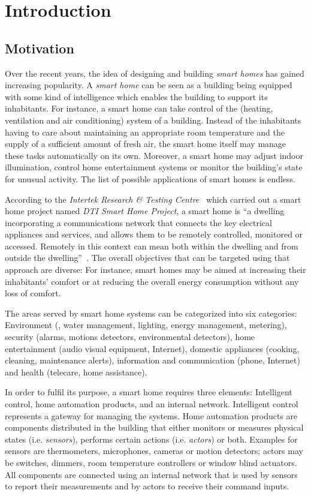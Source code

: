\chapter{Introduction}
\label{ch:intro}

\section{Motivation}
\label{sec:motivation}

Over the recent years, the idea of designing and building \emph{smart homes} has gained increasing popularity. A \emph{smart home} can be seen as a building being equipped with some kind of intelligence which enables the building to support its inhabitants. For instance, a smart home can take control of the  (heating, ventilation and air conditioning) system of a building. Instead of the inhabitants having to care about maintaining an appropriate room temperature and the supply of a sufficient amount of fresh air, the smart home itself may manage these tasks automatically on its own. Moreover, a smart home may adjust indoor illumination, control home entertainment systems or monitor the building's state for unusual activity. The list of possible applications of smart homes is endless.

According to the \emph{Intertek Research \& Testing Centre}~\cite{intertek} which carried out a smart home project named \emph{DTI Smart Home Project}, a smart home is ``a dwelling incorporating a communications network that connects the key electrical appliances and services, and allows them to be remotely controlled, monitored or accessed. Remotely in this context can mean both within the dwelling and from outside the dwelling''~\cite{SmartHomeDefinition,SmartHomeResearch}. The overall objectives that can be targeted using that approach are diverse: For instance, smart homes may be aimed at increasing their inhabitants' comfort or at reducing the overall energy consumption without any loss of comfort.

The areas served by smart home systems can be categorized into six categories: Environment (, water management, lighting, energy management, metering), security (alarms, motions detectors, environmental detectors), home entertainment (audio visual equipment, Internet), domestic appliances (cooking, cleaning, maintenance alerts), information and communication (phone, Internet) and health (telecare, home assistance).

In order to fulfil its purpose, a smart home requires three elements: Intelligent control, home automation products, and an internal network. Intelligent control represents a gateway for managing the systems. Home automation products are components distributed in the building that either monitors or measures physical states (i.e. \emph{sensors}), performs certain actions (i.e. \emph{actors}) or both. Examples for sensors are thermometers, microphones, cameras or motion detectors; actors may be switches, dimmers, room temperature controllers or window blind actuators. All components are connected using an internal network that is used by sensors to report their measurements and by actors to receive their command inputs.

